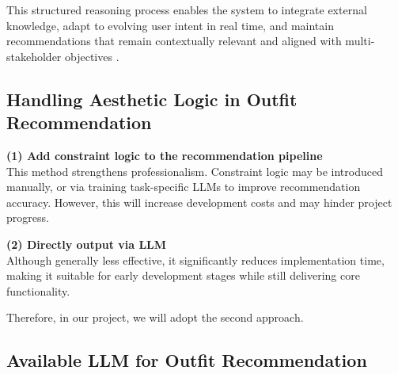 This structured reasoning process enables the system to integrate external knowledge, adapt to evolving user intent in real time, and maintain recommendations that remain contextually relevant and aligned with multi-stakeholder objectives \citep{deldjoo2025agentic}.



\subsection{Handling Aesthetic Logic in Outfit Recommendation}
\textbf{\large (1) Add constraint logic to the recommendation pipeline}\\[0.4cm]
This method strengthens professionalism. Constraint logic may be introduced manually, or via training task-specific LLMs to improve recommendation accuracy. However, this will increase development costs and may hinder project progress.

\textbf{\large (2) Directly output via LLM}\\[0.4cm]
Although generally less effective, it significantly reduces implementation time, making it suitable for early development stages while still delivering core functionality.


Therefore, in our project, we will adopt the second approach.




\subsection{Available LLM for Outfit Recommendation}
\begin{table}[H]
\centering
\caption{Comparison of Available LLM Models for Outfit Recommendation}
\label{tab:llm_comparison}
\end{table}

